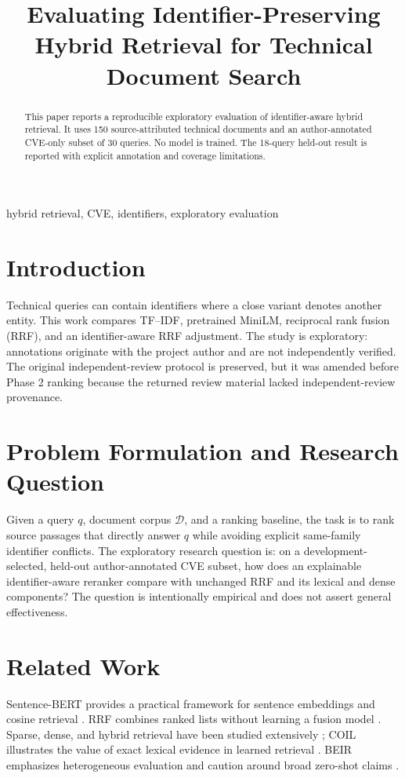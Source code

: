 \documentclass[conference]{IEEEtran}
\title{Evaluating Identifier-Preserving Hybrid Retrieval for Technical Document Search}
\author{\IEEEauthorblockN{Project Research Report}\IEEEauthorblockA{Author-Annotated Exploratory Study}}
\begin{document}
\maketitle
\begin{abstract}
This paper reports a reproducible exploratory evaluation of identifier-aware hybrid retrieval. It uses 150 source-attributed technical documents and an author-annotated CVE-only subset of 30 queries. No model is trained. The 18-query held-out result is reported with explicit annotation and coverage limitations.
\end{abstract}
\begin{IEEEkeywords}hybrid retrieval, CVE, identifiers, exploratory evaluation\end{IEEEkeywords}
\section{Introduction}
Technical queries can contain identifiers where a close variant denotes another entity. This work compares TF--IDF, pretrained MiniLM, reciprocal rank fusion (RRF), and an identifier-aware RRF adjustment. The study is exploratory: annotations originate with the project author and are not independently verified. The original independent-review protocol is preserved, but it was amended before Phase 2 ranking because the returned review material lacked independent-review provenance.

\section{Problem Formulation and Research Question}
Given a query $q$, document corpus $\mathcal{D}$, and a ranking baseline, the task is to rank source passages that directly answer $q$ while avoiding explicit same-family identifier conflicts. The exploratory research question is: on a development-selected, held-out author-annotated CVE subset, how does an explainable identifier-aware reranker compare with unchanged RRF and its lexical and dense components? The question is intentionally empirical and does not assert general effectiveness.

\section{Related Work}
Sentence-BERT provides a practical framework for sentence embeddings and cosine retrieval \cite{reimers}. RRF combines ranked lists without learning a fusion model \cite{cormack}. Sparse, dense, and hybrid retrieval have been studied extensively \cite{luan}; COIL illustrates the value of exact lexical evidence in learned retrieval \cite{gao}. BEIR emphasizes heterogeneous evaluation and caution around broad zero-shot claims \cite{beir}.
\end{document}
